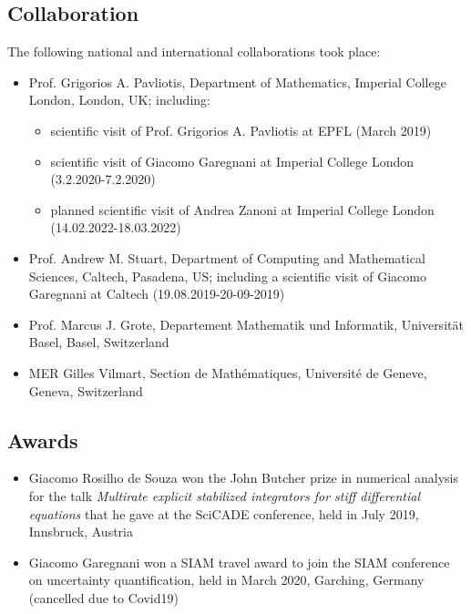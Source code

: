 \documentclass[10pt]{article}
\begin{document}
\subsection{Collaboration}

The following national and international collaborations took place:
\begin{itemize}
	\item Prof. Grigorios A. Pavliotis, Department of Mathematics, Imperial College London, London, UK; including: 
	\begin{itemize}
		\item scientific visit of Prof. Grigorios A. Pavliotis at EPFL (March 2019)
		\item scientific visit of Giacomo Garegnani at Imperial College London (3.2.2020-7.2.2020)
		\item planned scientific visit of Andrea Zanoni at Imperial College London (14.02.2022-18.03.2022)
	\end{itemize}
	\item Prof. Andrew M. Stuart, Department of Computing and Mathematical Sciences, Caltech, Pasadena, US; including a scientific visit of Giacomo Garegnani at Caltech (19.08.2019-20-09-2019)
	\item Prof. Marcus J. Grote, Departement Mathematik und Informatik, Universität Basel, Basel, Switzerland
	\item MER Gilles Vilmart, Section de Mathématiques, Université de Geneve, Geneva, Switzerland
\end{itemize}

\subsection{Awards}

\begin{itemize}
	\item Giacomo Rosilho de Souza won the John Butcher prize in numerical analysis for the talk \textit{Multirate explicit stabilized integrators for stiff differential equations} that he gave at the SciCADE conference, held in July 2019, Innsbruck, Austria
	\item Giacomo Garegnani won a SIAM travel award to join the SIAM conference on uncertainty quantification, held in March 2020, Garching, Germany (cancelled due to Covid19) 
\end{itemize}
\end{document}
